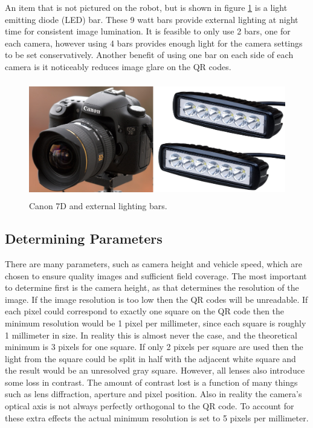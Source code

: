 An item that is not pictured on the robot, but is shown in figure \ref{figure:canon_and_bars} is a light emitting diode (LED) bar.  These 9 watt bars provide external lighting at night time for consistent image lumination.  It is feasible to only use 2 bars, one for each camera, however using 4 bars provides enough light for the camera settings to be set conservatively.  Another benefit of using one bar on each side of each camera is it noticeably reduces image glare on the QR codes.  

\begin{figure}[htb]
	\centering
    \includegraphics[height=2in]{figures/canon7d_and_LEDs.png}
    \caption[Canon 7D and LED bars]{Canon 7D and external lighting bars.}
    \label{figure:canon_and_bars}
\end{figure}

\subsection{Determining Parameters}

There are many parameters, such as camera height and vehicle speed, which are chosen to ensure quality images and sufficient field coverage.  The most important to determine first is the camera height, as that determines the resolution of the image.  If the image resolution is too low then the QR codes will be unreadable.  
If each pixel could correspond to exactly one square on the QR code then the minimum resolution would be 1 pixel per millimeter, since each square is roughly 1 millimeter in size.  In reality this is almost never the case, and the theoretical minimum is 3 pixels for one square.  If only 2 pixels per square are used then the light from the square could be split in half with the adjacent white square and the result would be an unresolved gray square.  However, all lenses also introduce some loss in contrast.  The amount of contrast lost is a function of many things such as lens diffraction, aperture and pixel position.  Also in reality the camera's optical axis is not always perfectly orthogonal to the QR code.  To account for these extra effects the actual minimum resolution is set to 5 pixels per millimeter.  


